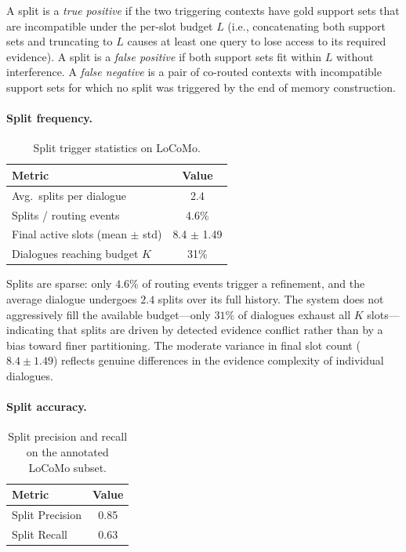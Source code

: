 \documentclass{article}
\theoremstyle{plain}
\theoremstyle{definition}
\theoremstyle{remark}
\begin{document}
A split is a \emph{true positive} if the two triggering contexts have
gold support sets that are incompatible under the per-slot budget $L$
(i.e., concatenating both support sets and truncating to $L$ causes at
least one query to lose access to its required evidence). A split is a
\emph{false positive} if both support sets fit within $L$ without
interference. A \emph{false negative} is a pair of co-routed contexts
with incompatible support sets for which no split was triggered by the
end of memory construction.

\paragraph{Split frequency.}

\begin{table}[h]
\centering
\caption{Split trigger statistics on LoCoMo.}
\label{tab:split-freq}
\small
\begin{tabular}{lc}
\toprule
Metric & Value \\
\midrule
Avg.\ splits per dialogue          & 2.4 \\
Splits / routing events             & 4.6\% \\
Final active slots (mean $\pm$ std) & 8.4 $\pm$ 1.49 \\
Dialogues reaching budget $K$       & 31\% \\
\bottomrule
\end{tabular}
\end{table}

\noindent
Splits are sparse: only $4.6\%$ of routing events trigger a refinement,
and the average dialogue undergoes $2.4$ splits over its full history.
The system does not aggressively fill the available budget---only
$31\%$ of dialogues exhaust all $K$ slots---indicating that splits are
driven by detected evidence conflict rather than by a bias toward finer
partitioning. The moderate variance in final slot count ($8.4 \pm 1.49$)
reflects genuine differences in the evidence complexity of individual
dialogues. 


\paragraph{Split accuracy.}

\begin{table}[h]
\centering
\caption{Split precision and recall on the annotated LoCoMo subset.}
\label{tab:split-acc}
\small
\begin{tabular}{lc}
\toprule
Metric & Value \\
\midrule
Split Precision & 0.85 \\
Split Recall    & 0.63 \\
\bottomrule
\end{tabular}
\end{table}
\end{document}
